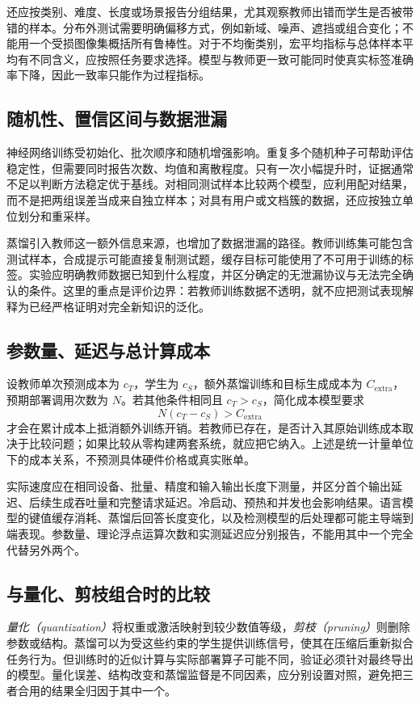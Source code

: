 \documentclass[UTF8,12pt,a4paper,fontset=fandol]{ctexart}
\begin{document}
还应按类别、难度、长度或场景报告分组结果，尤其观察教师出错而学生是否被带错的样本。分布外测试需要明确偏移方式，例如新域、噪声、遮挡或组合变化；不能用一个受损图像集概括所有鲁棒性。对于不均衡类别，宏平均指标与总体样本平均有不同含义，应按照任务要求选择。模型与教师更一致可能同时使真实标签准确率下降，因此一致率只能作为过程指标。

\subsection{随机性、置信区间与数据泄漏}
神经网络训练受初始化、批次顺序和随机增强影响。重复多个随机种子可帮助评估稳定性，但需要同时报告次数、均值和离散程度。只有一次小幅提升时，证据通常不足以判断方法稳定优于基线。对相同测试样本比较两个模型，应利用配对结果，而不是把两组误差当成来自独立样本；对具有用户或文档簇的数据，还应按独立单位划分和重采样。

蒸馏引入教师这一额外信息来源，也增加了数据泄漏的路径。教师训练集可能包含测试样本，合成提示可能直接复制测试题，缓存目标可能使用了不可用于训练的标签。实验应明确教师数据已知到什么程度，并区分确定的无泄漏协议与无法完全确认的条件。这里的重点是评价边界：若教师训练数据不透明，就不应把测试表现解释为已经严格证明对完全新知识的泛化。

\subsection{参数量、延迟与总计算成本}
设教师单次预测成本为 $c_T$，学生为 $c_S$，额外蒸馏训练和目标生成成本为 $C_{\mathrm{extra}}$，预期部署调用次数为 $N$。若其他条件相同且 $c_T>c_S$，简化成本模型要求
\begin{equation}
 N(c_T-c_S)>C_{\mathrm{extra}}
 \label{eq:kd-amortization}
\end{equation}
才会在累计成本上抵消额外训练开销。若教师已存在，是否计入其原始训练成本取决于比较问题；如果比较从零构建两套系统，就应把它纳入。上述是统一计量单位下的成本关系，不预测具体硬件价格或真实账单。

实际速度应在相同设备、批量、精度和输入输出长度下测量，并区分首个输出延迟、后续生成吞吐量和完整请求延迟。冷启动、预热和并发也会影响结果。语言模型的键值缓存消耗、蒸馏后回答长度变化，以及检测模型的后处理都可能主导端到端表现。参数量、理论浮点运算次数和实测延迟应分别报告，不能用其中一个完全代替另外两个。

\subsection{与量化、剪枝组合时的比较}
\emph{量化（quantization）}将权重或激活映射到较少数值等级，\emph{剪枝（pruning）}则删除参数或结构。蒸馏可以为受这些约束的学生提供训练信号，使其在压缩后重新拟合任务行为。但训练时的近似计算与实际部署算子可能不同，验证必须针对最终导出的模型。量化误差、结构改变和蒸馏监督是不同因素，应分别设置对照，避免把三者合用的结果全归因于其中一个。
\end{document}
